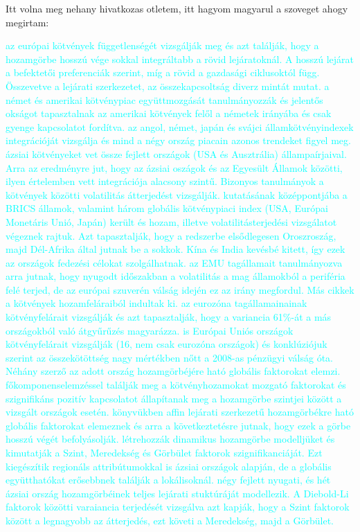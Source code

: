 \documentclass[12pt,bibliography=totoc]{article}
\begin{document}
\bigskip{}
Itt volna meg nehany hivatkozas otletem, itt hagyom magyarul a szoveget ahogy megirtam:
\bigskip{}


\textcolor{cyan}{\cite{yang2016interdependence} az európai kötvények függetlenségét vizsgálják meg és azt találják, hogy a hozamgörbe hosszú vége sokkal integráltabb a rövid lejáratoknál. A hosszú lejárat a befektetői preferenciák szerint, míg a rövid a gazdasági ciklusoktól függ. Összevetve a lejárati szerkezetet, az összekapcsoltság diverz mintát mutat.
\cite{engsted2007comovement} a német és amerikai kötvénypiac együttmozgását tanulmányozzák és jelentős okságot tapasztalnak az amerikai kötvények felől a németek irányába és csak gyenge kapcsolatot fordítva.
\cite{davies2007international} az angol, német, japán és svájci államkötvényindexek integrációját vizsgálja és mind a négy ország piacain azonos trendeket figyel meg.
\cite{vo2009international} ázsiai kötvényeket vet össze fejlett országok (USA és Ausztrália) állampaírjaival. Arra az eredményre jut, hogy az ázsiai oszágok és az Egyesült Államok közötti, ilyen értelemben vett integrációja alacsony szintű.
Bizonyos tanulmányok a kötvények közötti volatilitás átterjedést vizsgálják. 
\cite{ahmad2018financial} kutatásának középpontjába a BRICS államok, valamint három globális kötvénypiaci index (USA, Európai Monetáris Unió, Japán) került és hozam, illetve volatilitásterjedési vizsgálatot végeznek rajtuk. Azt tapasztalják, hogy a redszerbe elsődlegesen Oroszroszág, majd Dél-Afrika által jutnak be a sokkok. Kína és India kevésbé kitett, így ezek az országok fedezési célokat szolgálhatnak.
\cite{fernandez2016using} az EMU tagállamait tanulmányozva arra jutnak, hogy nyugodt időszakban a volatilitás a mag államokból a periféria felé terjed, de az európai szuverén válság idején ez az irány megfordul.
Más cikkek a kötvények hozamfeláraiból indultak ki. 
\cite{antonakakis2013sovereign} az eurozóna tagállamainainak kötvényfelárait vizsgálják és azt tapasztalják, hogy a variancia 61\%-át a más országokból való átgyűrűzés magyarázza. 
\cite{claeys2014measuring} is Európai Uniós országok kötvényfelárait vizsgálják (16, nem csak eurozóna országok) és konklúziójuk szerint az összekötöttség nagy mértékben nőtt a 2008-as pénzügyi válság óta.
Néhány szerző az adott ország hozamgörbéjére ható globális faktorokat elemzi. \cite{driessen2003common} főkomponenselemzéssel találják meg a kötvényhozamokat mozgató faktorokat és szignifikáns pozitív kapcsolatot állapítanak meg a hozamgörbe szintjei között a vizsgált országok esetén.
\cite{abbritti2013global} könyvükben affin lejárati szerkezetű hozamgörbékre ható globális faktorokat elemeznek és arra a következtetésre jutnak, hogy ezek a görbe hosszú végét befolyásolják.
\cite{diebold2008global} létrehozzák dinamikus hozamgörbe modelljüket és kimutatják a Szint, Meredekség és Görbület faktorok szignifikanciáját.
Ezt \cite{bae2011global} kiegészítik regionáls attribútumokkal is ázsiai országok alapján, de a globális együtthatókat erősebbnek találják a lokálisoknál.
\cite{sowmya2016linkages} négy fejlett nyugati, és hét ázsiai ország hozamgörbéinek teljes lejárati stuktúráját modellezik. A Diebold-Li faktorok közötti varaiancia terjedését vizsgálva azt kapják, hogy a Szint faktorok között a legnagyobb az átterjedés, ezt követi a Meredekség, majd a Görbület.}
\end{document}
